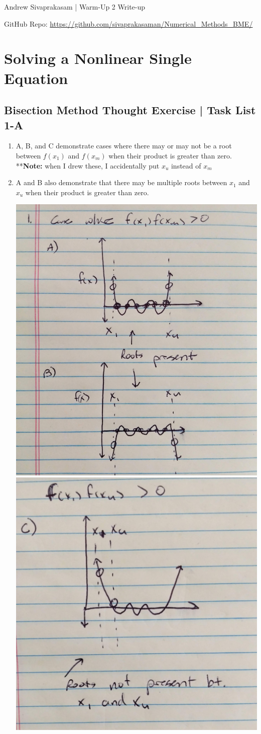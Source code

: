 \documentclass[12pt]{extarticle}
\begin{document}
{\Large Andrew Sivaprakasam | Warm-Up 2 Write-up}

GitHub Repo: \url{https://github.com/sivaprakasaman/Numerical_Methods_BME/} 

\section{Solving a Nonlinear Single Equation}


\subsection{Bisection Method Thought Exercise | Task List 1-A}

\begin{enumerate}
\item A, B, and C demonstrate cases where there may or may not be a root between $f(x_1)$ and $f(x_m)$ when their product is greater than zero. 
**\textbf{Note:} when I drew these, I accidentally put $x_u$ instead of $x_m$
\item A and B also demonstrate that there may be multiple roots between $x_1$ and $x_u$ when their product is greater than zero.
\\
\begin{center}
\includegraphics[width = .45\textwidth]{pic_1}
\includegraphics[width = .45\textwidth]{pic_2}
\end{center}


\end{enumerate}
\end{document}
